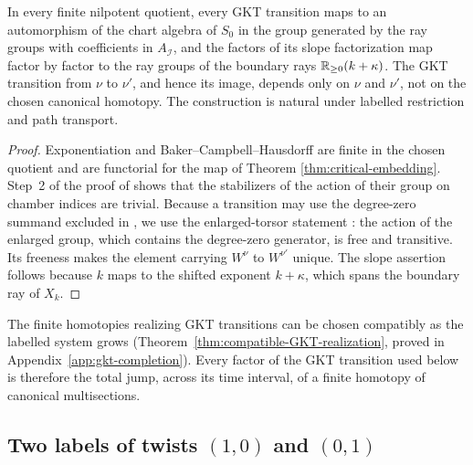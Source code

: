 \begin{proposition}
\label{prop:endpoint-operations}
In every finite nilpotent quotient, every GKT transition maps to an
automorphism of the chart algebra of $S_0$ in the group generated by the ray
groups with coefficients in $A_{\mathcal I}$, and the factors of its slope
factorization map factor by factor to the ray groups of the boundary rays
$\mathbb R_{\geq0}(k+\kappa)$.  The
GKT transition from $\nu$ to $\nu'$, and hence its image, depends only on
$\nu$ and $\nu'$, not on the chosen canonical homotopy.  The construction is
natural under labelled restriction and path transport.
\end{proposition}

\begin{proof}
Exponentiation and Baker--Campbell--Hausdorff are finite in the chosen
quotient and are functorial for the map of Theorem
\ref{thm:critical-embedding}.  Step~2 of the proof of
\cite[Thm.~4.27]{grossetal2022open} shows that the stabilizers of the action
of their group on chamber indices are trivial.  Because a transition may
use the degree-zero summand excluded in
\cite[Def.~4.23]{grossetal2022open}, we use the enlarged-torsor statement
\cite[Lem.~2.5]{wuebben2026boundary}: the action of the enlarged group, which
contains the degree-zero generator, is free and transitive.  Its freeness
makes the element carrying $W^\nu$ to $W^{\nu'}$ unique.  The slope
assertion follows because $k$ maps to the shifted exponent $k+\kappa$,
which spans the boundary ray of $X_k$.
\end{proof}

The finite homotopies realizing GKT transitions can be chosen compatibly as
the labelled system grows (Theorem~\ref{thm:compatible-GKT-realization},
proved in Appendix~\ref{app:gkt-completion}).  Every factor of the GKT
transition used below is therefore the total jump, across its time interval, of a finite homotopy of
canonical multisections.

\subsection{Two labels of twists \texorpdfstring{$(1,0)$ and $(0,1)$}{(1,0) and (0,1)}}
\label{subsec:first-mixed-ray}

